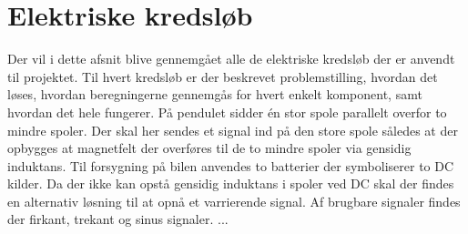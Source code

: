 
\section{Elektriske kredsløb}\label{sec:sec_sparningsreg}
Der vil i dette afsnit blive gennemgået alle de elektriske kredsløb der er anvendt til projektet. Til hvert kredsløb er der beskrevet problemstilling, hvordan det løses, hvordan beregningerne gennemgås for hvert enkelt komponent, samt hvordan det hele fungerer.
På pendulet sidder én stor spole parallelt overfor to mindre spoler. Der skal her sendes et signal ind på den store spole således at der opbygges at magnetfelt der overføres til de to mindre spoler via gensidig induktans. Til forsygning på bilen anvendes to batterier der symboliserer to DC kilder. Da der ikke kan opstå gensidig induktans i spoler ved DC skal der findes en alternativ løsning til at opnå et varrierende signal. Af brugbare signaler findes der firkant, trekant og sinus signaler.
...
